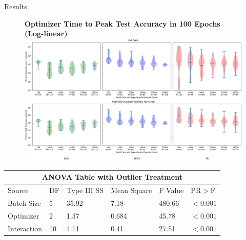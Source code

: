 \documentclass[final]{beamer}
\newlength{\colwidth}
\begin{document}
\begin{frame}[t]
\begin{columns}[t]
\begin{column}{\colwidth}
\begin{block}{Results}
        \begin{figure}
          \centering
          \textbf{Optimizer Time to Peak Test Accuracy in 100 Epochs (Log-linear)}
          \includegraphics[width=\columnwidth]{ttp_violin_comparison.png}
        \end{figure}
        \begin{table}[]
          \begin{tabular}{|llllll|}
            \hline
            \multicolumn{6}{|c|}{\textbf{ANOVA Table with Outlier Treatment}}                                                                                                      \\ \hline
            \multicolumn{1}{|l|}{Source} & \multicolumn{1}{l|}{DF} & \multicolumn{1}{l|}{Type III SS} & \multicolumn{1}{l|}{Mean Square} & \multicolumn{1}{l|}{F Value} & PR$>$F   \\ \hline
            Batch Size                   & 5                       & 35.92                            & 7.18                             & 480.66                       & $<0.001$ \\
            Optimizer                    & 2                       & 1.37                             & 0.684                            & 45.78                        & $<0.001$ \\
            Interaction                  & 10                      & 4.11                             & 0.41                             & 27.51                        & $<0.001$ \\ \hline
          \end{tabular}
        \end{table}


      \end{block}

    \end{column}


\end{columns}
\end{frame}
\end{document}
